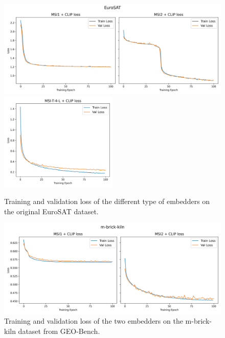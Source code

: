 \documentclass[a4paper, oneside, english]{sapthesis} %
\begin{document}
\vspace{-0.3cm}

\begin{figure}[H]
    \centering
    \includegraphics[width=\textwidth]{img/EuroSAT_loss_plot.png}
     \includegraphics[width=0.5\textwidth]{img/EuroSAT_4L_loss_plot.png}
    \caption{Training and validation loss of the different type of embedders on the original EuroSAT dataset.}
    \label{fig:eurosatloss}
\end{figure}

\begin{figure}[H]
    \centering
    \includegraphics[width=\textwidth]{img/m-brick-kiln_loss_plot.png}
    \caption{Training and validation loss of the two embedders on the m-brick-kiln dataset from GEO-Bench.}
    \label{fig:brickloss}
\end{figure}

\vspace{-0.3cm}
\end{document}
